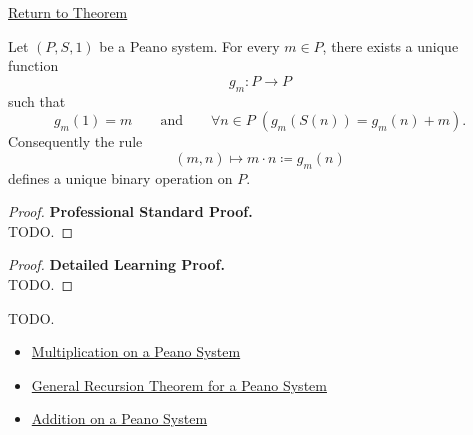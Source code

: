 \newpage
{}
\label{prf:multiplication-well-defined-on-peano-system}

\begin{remark*}[Return]
\hyperref[thm:multiplication-well-defined-on-peano-system]{Return to Theorem}
\end{remark*}

\begin{theorem*}
Let $(P,S,1)$ be a Peano system. For every $m \in P$, there exists a unique
function
\[
g_m : P \to P
\]
such that
\[
g_m(1)=m
\qquad\text{and}\qquad
\forall n \in P\;(g_m(S(n))=g_m(n)+m).
\]
Consequently the rule
\[
(m,n) \longmapsto m \cdot n \coloneqq g_m(n)
\]
defines a unique binary operation on $P$.
\end{theorem*}

\begin{proof}
\textbf{Professional Standard Proof.}~\\
TODO.
\end{proof}

\begin{proof}
\textbf{Detailed Learning Proof.}~\\
TODO.
\end{proof}

\begin{remark*}
TODO.
\end{remark*}

\begin{dependencies}
\begin{itemize}
  \item \hyperref[def:multiplication-on-peano-system]{Multiplication on a Peano System}
  \item \hyperref[thm:general-recursion-theorem-for-peano-system]{General Recursion Theorem for a Peano System}
  \item \hyperref[def:addition-on-peano-system]{Addition on a Peano System}
\end{itemize}
\end{dependencies}
